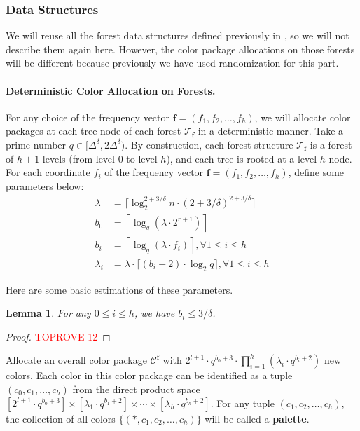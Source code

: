 \documentclass[11pt,a4paper]{article}
\newtheorem{lemma}{Lemma}[section]
\newcommand{\ceil}[1]{\lceil #1 \rceil}
\newcommand{\tree}{\mathcal{T}}
\newcommand{\freq}{\mathbf{f}}
\newcommand{\clr}{\mathcal{C}}
\begin{document}
\subsubsection{Data Structures}
We will reuse all the forest data structures defined previously in , so we will not describe them again here. However, the color package allocations on those forests will be different because previously we have used randomization for this part.

\paragraph*{Deterministic Color Allocation on Forests.} For any choice of the frequency vector $\freq = (f_1, f_2, \ldots, f_h)$, we will allocate color packages at each tree node of each forest $\tree_\freq$ in a deterministic manner. Take a prime number $q\in [\Delta^\delta, 2\Delta^\delta)$. By construction, each forest structure $\tree_\freq$ is a forest of $h+1$ levels (from level-$0$ to level-$h$), and each tree is rooted at a level-$h$ node. For each coordinate $f_i$ of the frequency vector $\freq = (f_1, f_2, \ldots, f_h)$, define some parameters below:
$$\begin{aligned}
	\lambda &= \ceil{\log_2^{2+3/\delta}n\cdot (2 + 3/\delta)^{2+3/\delta}}\\
	b_0 &= \left\lceil\log_q(\lambda\cdot 2^{r+1})\right\rceil\\
	b_i &= \left\lceil\log_q(\lambda\cdot f_i)\right\rceil, \forall 1\leq i\leq h\\
	\lambda_i &= \lambda\cdot \ceil{(b_i+2)\cdot\log_2q}, \forall 1\leq i\leq h
\end{aligned}$$

Here are some basic estimations of these parameters.
\begin{lemma}\label{param-ineq}
    For any $0\leq i\leq h$, we have $b_i\leq 3/\delta$.
\end{lemma}
\begin{proof}\textcolor{red}{TOPROVE 12}\end{proof}

Allocate an overall color package $\clr^\freq$ with $2^{l+1}\cdot q^{b_0+3}\cdot\prod_{i=1}^h(\lambda_i\cdot q^{b_i+2})$ new colors. Each color in this color package can be identified as a tuple $(c_0, c_1, \ldots, c_h)$ from the direct product space $[2^{l+1}\cdot q^{b_0+3}]\times [\lambda_1\cdot q^{b_1+2}] \times\cdots\times [\lambda_{h}\cdot q^{b_{h}+2}]$. For any tuple $(c_1, c_2, \ldots, c_h)$, the collection of all colors $\{(*, c_1, c_2, \ldots, c_h)\}$ will be called a \textbf{palette}. 
\end{document}
